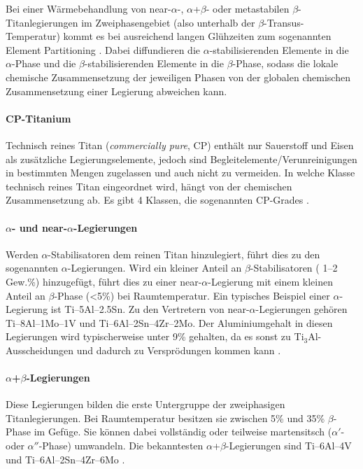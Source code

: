 Bei einer Wärmebehandlung von near-$\alpha$-, $\alpha$+$\beta$- oder metastabilen $\beta$-Titanlegierungen im Zweiphasengebiet (also unterhalb der $\beta$-Transus-Temperatur) kommt es bei ausreichend langen Glühzeiten zum sogenannten Element Partitioning \cite{Lutjering.2007}. Dabei diffundieren die $\alpha$-stabilisierenden Elemente in die $\alpha$-Phase und die $\beta$-stabilisierenden Elemente in die $\beta$-Phase, sodass die lokale chemische Zusammensetzung der jeweiligen Phasen von der globalen chemischen Zusammensetzung einer Legierung abweichen kann.



\paragraph{CP-Titanium} 
Technisch reines Titan (\textit{commercially pure}, CP) enthält nur Sauerstoff und Eisen als zusätzliche Legierungselemente, jedoch sind Begleitelemente/Verunreinigungen in bestimmten Mengen zugelassen und auch nicht zu vermeiden. In welche Klasse technisch reines Titan eingeordnet wird, hängt von der chemischen Zusammensetzung ab. Es gibt 4 Klassen, die sogenannten CP-Grades \cite{C.Leyens.2005}.

\paragraph{$\alpha$- und near-$\alpha$-Legierungen}
Werden $\alpha$-Stabilisatoren dem reinen Titan hinzulegiert, führt dies zu den sogenannten $\alpha$-Legierungen. Wird ein kleiner Anteil an $\beta$-Stabilisatoren ( 1--2 Gew.\%) hinzugefügt, führt dies zu einer near-$\alpha$-Legierung mit einem kleinen Anteil an $\beta$-Phase (\textless5\%) bei Raumtemperatur. Ein typisches Beispiel einer $\alpha$-Legierung ist Ti–5Al–2.5Sn. Zu den Vertretern von near-$\alpha$-Legierungen gehören Ti–8Al–1Mo–1V und Ti–6Al–2Sn–4Zr–2Mo. Der Aluminiumgehalt in diesen Legierungen wird typischerweise unter 9\% gehalten, da es sonst zu Ti$_3$Al-Ausscheidungen und dadurch zu Versprödungen kommen kann \cite{C.Leyens.2005,Lutjering.2007,Boyer.2007,M.J.Donachie.2010}.

\paragraph{$\alpha$+$\beta$-Legierungen}
Diese Legierungen bilden die erste Untergruppe der zweiphasigen Titanlegierungen. Bei Raumtemperatur besitzen sie zwischen 5\% und 35\% $\beta$-Phase im Gefüge. Sie können dabei vollständig oder teilweise martensitsch ($\alpha'$- oder $\alpha''$-Phase) umwandeln. Die bekanntesten $\alpha$+$\beta$-Legierungen sind Ti–6Al–4V und Ti–6Al–2Sn–4Zr–6Mo \cite{C.Leyens.2005,Lutjering.2007,Boyer.2007,M.J.Donachie.2010}.

